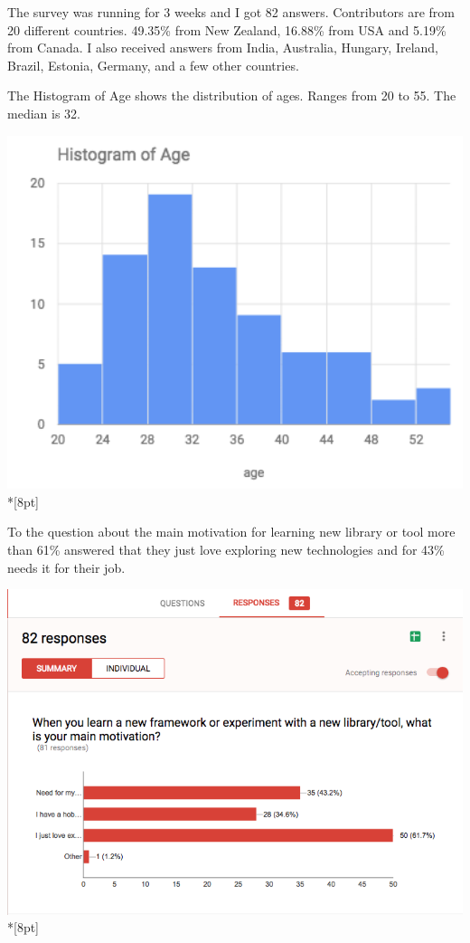 \documentclass[11pt, a4paper, oneside, openright, medskipamount]{report}
\begin{document}
The survey was running for 3 weeks and I got 82 answers. Contributors are from 20 different countries. 49.35\% from New Zealand, 16.88\% from USA and 5.19\% from Canada. I also received answers from India, Australia, Hungary, Ireland, Brazil, Estonia, Germany, and a few other countries.

The Histogram of Age shows the distribution of ages. Ranges from 20 to 55. The median is 32.

\includegraphics[width=1\textwidth]{assets/survey-result/histogram-of-age.png}\\*[8pt]

To the question about the main motivation for learning new library or tool more than 61\% answered that they just love exploring new technologies and for 43\% needs it for their job.

\includegraphics[width=1\textwidth]{assets/survey-result/main-motivation.png}\\*[8pt]
\end{document}
